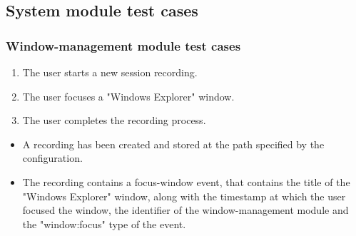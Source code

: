 \subsection{System module test cases}

\subsubsection{Window-management module test cases}

\begin{tests}
	{\begin{enumerate}
		\item The \gls{user} starts a new \gls{session} recording.
		\item The \gls{user} focuses a "Windows Explorer" window.
		\item The \gls{user} completes the recording process.
	\end{enumerate}}
	{\begin{itemize}
		\item A recording has been created and stored at the path specified by the configuration.
		\item The recording contains a focus-window \gls{event},  that contains the title of the "Windows Explorer" window, along with the timestamp at which the \gls{user} focused the window, the identifier of the window-management module and the "window:focus" type of the event.
	\end{itemize}}
	

\end{tests}
